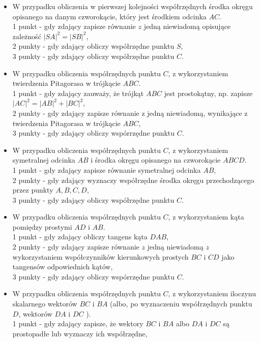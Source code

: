\documentclass[10pt]{article}
\begin{document}
\begin{itemize}
  \item W przypadku obliczenia w pierwszej kolejności współrzędnych środka okręgu opisanego na danym czworokącie, który jest środkiem odcinka $A C$.\\
1 punkt - gdy zdający zapisze równanie $z$ jedną niewiadomą opisujące zależność $|S A|^{2}=|S B|^{2}$,\\
2 punkty - gdy zdający obliczy współrzędne punktu $S$,\\
3 punkty - gdy zdający obliczy współrzędne punktu $C$.
  \item W przypadku obliczenia współrzędnych punktu $C$, z wykorzystaniem twierdzenia Pitagorasa w trójkącie $A B C$.\\
1 punkt - gdy zdający zauważy, że trójkąt $A B C$ jest prostokątny, np. zapisze $|A C|^{2}=|A B|^{2}+|B C|^{2}$,\\
2 punkty - gdy zdający zapisze równanie z jedną niewiadomą, wynikające z twierdzenia Pitagorasa w trójkącie $A B C$,\\
3 punkty - gdy zdający obliczy wspórrzędne punktu $C$.
  \item W przypadku obliczenia współrzędnych punktu $C$, z wykorzystaniem symetralnej odcinka $A B$ i środka okręgu opisanego na czworokącie $A B C D$.\\
1 punkt - gdy zdający zapisze równanie symetralnej odcinka $A B$,\\
2 punkty - gdy zdający wyznaczy współrzędne środka okręgu przechodzącego przez punkty $A, B, C, D$,\\
3 punkty - gdy zdający obliczy współrzędne punktu $C$.
  \item W przypadku obliczenia współrzędnych punktu $C$, z wykorzystaniem kąta pomiędzy prostymi $A D$ i $A B$.\\
1 punkt - gdy zdający obliczy tangens kąta $D A B$,\\
2 punkty - gdy zdający zapisze równanie $z$ jedną niewiadomą $z$ wykorzystaniem współczynników kierunkowych prostych $B C$ i $C D$ jako tangensów odpowiednich kątów,\\
3 punkty - gdy zdający obliczy wspórrzędne punktu $C$.
  \item W przypadku obliczenia współrzędnych punktu $C$, z wykorzystaniem iloczynu skalarnego wektorów $B C$ i $B A$ (albo, po wyznaczeniu współrzędnych punktu $D$, wektorów $D A$ i $D C$ ).\\
1 punkt - gdy zdający zapisze, że wektory $B C$ i $B A$ albo $D A$ i $D C$ są prostopadłe lub wyznaczy ich współrzędne,\\

\end{itemize}
\end{document}
